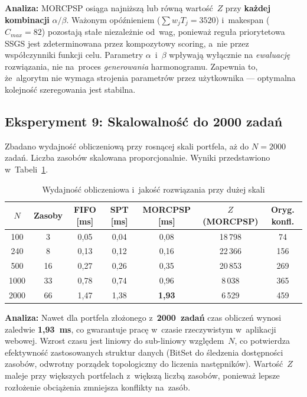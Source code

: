 \textbf{Analiza:} MORCPSP osiąga najniższą lub równą wartość~$Z$ przy \textbf{każdej kombinacji} $\alpha/\beta$. Ważonym opóźnieniem ($\sum w_j T_j = 3520$) i~makespan ($C_{max} = 82$) pozostają stałe niezależnie od~wag, ponieważ reguła priorytetowa SSGS jest zdeterminowana przez kompozytowy scoring, a~nie przez współczynniki funkcji celu. Parametry $\alpha$~i~$\beta$ wpływają wyłącznie na \textit{ewaluację} rozwiązania, nie na~proces \textit{generowania} harmonogramu. Zapewnia to, że~algorytm nie wymaga strojenia parametrów przez użytkownika --- optymalna kolejność szeregowania jest stabilna.

\subsection{Eksperyment 9: Skalowalność do 2000 zadań}

Zbadano wydajność obliczeniową przy rosnącej skali portfela, aż do $N = 2000$ zadań. Liczba zasobów skalowana proporcjonalnie. Wyniki przedstawiono w~Tabeli~\ref{tab:exp9_scale}.

\begin{table}[H]
\centering
\caption{Wydajność obliczeniowa i~jakość rozwiązania przy dużej skali}
\label{tab:exp9_scale}
\begin{tabular}{|c|c|c|c|c|c|c|}
\hline
$N$ & \textbf{Zasoby} & \textbf{FIFO [ms]} & \textbf{SPT [ms]} & \textbf{MORCPSP [ms]} & $Z$\textbf{(MORCPSP)} & \textbf{Oryg. konfl.} \\ \hline
100 & 3 & 0{,}05 & 0{,}04 & 0{,}08 & 18\,798 & 74 \\ \hline
240 & 8 & 0{,}13 & 0{,}12 & 0{,}16 & 22\,366 & 156 \\ \hline
500 & 16 & 0{,}27 & 0{,}26 & 0{,}35 & 20\,853 & 269 \\ \hline
1000 & 33 & 0{,}78 & 0{,}74 & 0{,}96 & 8\,038 & 365 \\ \hline
2000 & 66 & 1{,}47 & 1{,}38 & \textbf{1{,}93} & 6\,529 & 459 \\ \hline
\end{tabular}
\end{table}

\textbf{Analiza:} Nawet dla portfela złożonego z~\textbf{2000~zadań} czas obliczeń wynosi zaledwie \textbf{1{,}93~ms}, co gwarantuje pracę w~czasie rzeczywistym w~aplikacji webowej. Wzrost czasu jest liniowy do sub-liniowy względem~$N$, co potwierdza efektywność zastosowanych struktur danych (BitSet do śledzenia dostępności zasobów, odwrotny porządek topologiczny do liczenia następników). Wartość~$Z$ maleje przy większych portfelach z~większą liczbą zasobów, ponieważ lepsze rozłożenie obciążenia zmniejsza konflikty na~zasób.


